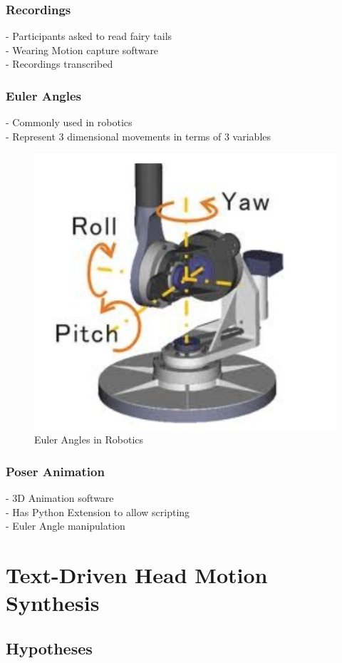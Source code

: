 \documentclass[bsc,frontabs,twoside,singlespacing,parskip]{infthesis}
\begin{document}
\subsection{Recordings}
- Participants asked to read fairy tails \\
- Wearing Motion capture software \\
- Recordings transcribed \\

\subsection{Euler Angles}
- Commonly used in robotics \\
- Represent 3 dimensional movements in terms of 3 variables\\

\begin{figure}[h!]
	\caption{Euler Angles in Robotics}
	\centering
	\includegraphics[width=.5\textwidth]{euler_angles.png}
\end{figure}

\subsection{Poser Animation}
- 3D Animation software \\
- Has Python Extension to allow scripting \\
- Euler Angle manipulation \\

\chapter{Text-Driven Head Motion Synthesis}

\section{Hypotheses}
\end{document}
